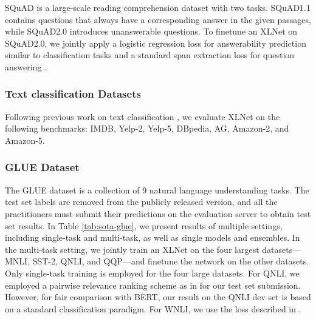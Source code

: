 SQuAD is a large-scale reading comprehension dataset with two tasks. SQuAD1.1 \cite{rajpurkar2016squad} contains questions that always have a corresponding answer in the given passages, while SQuAD2.0 \cite{rajpurkar2018know} introduces unanswerable questions. To finetune an XLNet on SQuAD2.0, we jointly apply a logistic regression loss for answerability prediction similar to classification tasks and a standard span extraction loss for question answering \cite{devlin2018bert}.

\subsubsection{Text classification Datasets}

Following previous work on text classification \cite{zhang2015character,miyato2016adversarial}, we evaluate XLNet on the following benchmarks: IMDB, Yelp-2, Yelp-5, DBpedia, AG, Amazon-2, and Amazon-5.

\subsubsection{GLUE Dataset}

The GLUE dataset \cite{wang2019glue} is a collection of 9 natural language understanding tasks. 
The test set labels are removed from the publicly released version, and all the practitioners must submit their predictions on the evaluation server to obtain test set results. In Table \ref{tab:sota-glue}, we present results of multiple settings, including single-task and multi-task, as well as single models and ensembles. In the multi-task setting, we jointly train an XLNet on the four largest datasets---MNLI, SST-2, QNLI, and QQP---and finetune the network on the other datasets. Only single-task training is employed for the four large datasets. For QNLI, we employed a pairwise relevance ranking scheme as in \cite{liu2019multi} for our test set submission. However, for fair comparison with BERT, our result on the QNLI dev set is based on a standard classification paradigm. For WNLI, we use the loss described in \cite{kocijan2019surprisingly}.

